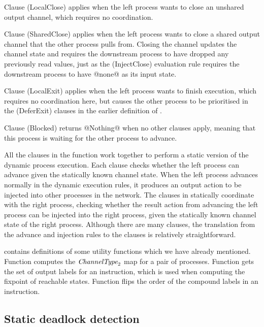 Clause (LocalClose) applies when the left process wants to close an unshared output channel, which requires no coordination.

Clause (SharedClose) applies when the left process wants to close a shared output channel that the other process pulls from.
Closing the channel updates the channel state and requires the downstream process to have dropped any previously read values, just as the (InjectClose) evaluation rule requires the downstream process to have @none@ as its input state.

Clause (LocalExit) applies when the left process wants to finish execution, which requires no coordination here, but causes the other process to be prioritised in the (DeferExit) clauses in the earlier definition of .

Clause (Blocked) returns @Nothing@ when no other clauses apply, meaning that this process is waiting for the other process to advance.

All the clauses in the  function work together to perform a static version of the dynamic process execution.
Each clause checks whether the left process can advance given the statically known channel state.
When the left process advances normally in the dynamic execution rules, it produces an output action to be injected into other processes in the network.
The clauses in  statically coordinate with the right process, checking whether the result action from advancing the left process can be injected into the right process, given the statically known channel state of the right process.
Although there are many clauses, the translation from the advance and injection rules to the clauses is relatively straightforward.

\smallskip



 contains definitions of some utility functions which we have already mentioned.
Function  computes the $\textit{ChannelType}_2$ map for a pair of processes.
Function  gets the set of output labels for an instruction, which is used when computing the fixpoint of reachable states.
Function  flips the order of the compound labels in an instruction.

\subsection{Static deadlock detection}

